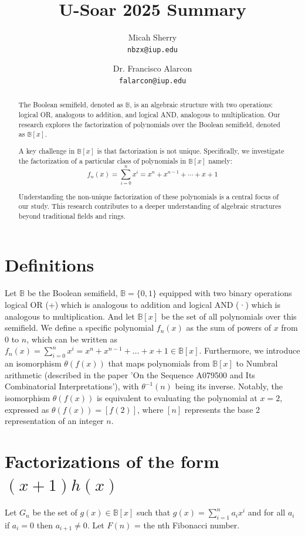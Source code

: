 \documentclass{article}
\title{U-Soar 2025 Summary}
\author{
    Micah Sherry \\
    \texttt{nbzx@iup.edu}
    \and
    Dr. Francisco Alarcon\\
    \texttt{falarcon@iup.edu}
}
\newcommand{\B}{\mathbb{B}}
\begin{document}
    \maketitle

    \begin{abstract}
        The Boolean semifield, denoted as $\B$, is an algebraic structure with two operations: logical OR, analogous to addition, and
        logical AND, analogous to multiplication. Our research explores the factorization of polynomials over the Boolean semifield, denoted as $\B[x]$.
        
        A key challenge in $\B[x]$ is that factorization is not unique. Specifically, we investigate the factorization of a particular
        class of polynomials in $\B[x]$ namely: $$f_n(x) = \sum_{i=0}^{n} x^i = x^n + x^{n-1} + \cdots + x + 1$$
        
        Understanding the non-unique factorization of these polynomials is a central focus of our study. This research contributes to a
        deeper understanding of algebraic structures beyond traditional fields and rings.
    \end{abstract}

    \section{Definitions}
        Let $\B$ be the Boolean semifield, $\B = \{0, 1\}$  equipped with two binary operations logical OR (+) which is analogous to addition and logical AND (·)
        which is analogous to multiplication. And let $\B[x]$ be the set of all polynomials over this semifield.
        We define a specific polynomial $f_n(x)$ as the sum of powers of $x$ from $0$ to $n$, which can be written as 
            $f_n(x) = \sum_{i=0}^n x^i = x^n + x^{n-1} + \dots + x + 1 \in \B[x]$.
        Furthermore, we introduce an isomorphism $\theta(f(x))$ that maps polynomials from $\mathbb{B}[x]$ to Numbral arithmetic
        (described in the paper 'On the Sequence A079500 and Its Combinatorial Interpretations'),
        with $\theta^{-1}(n)$ being its inverse. Notably, the isomorphism $\theta(f(x))$ is equivalent to evaluating the polynomial at $x=2$,
        expressed as $\theta(f(x)) = [f(2)]$, where $[n]$ represents the base 2 representation of an integer $n$.

    \section{Factorizations of the form $(x+1)h(x)$}
        Let $G_n$ be the set of $g(x) \in \B[x]$ such that $g(x) = \sum_{i=1}^n a_ix^i$
        and for all $a_i$ if $a_i = 0$ then $a_{i+1}\neq 0$.
        Let $F(n)$ = the nth Fibonacci number.
\end{document}
